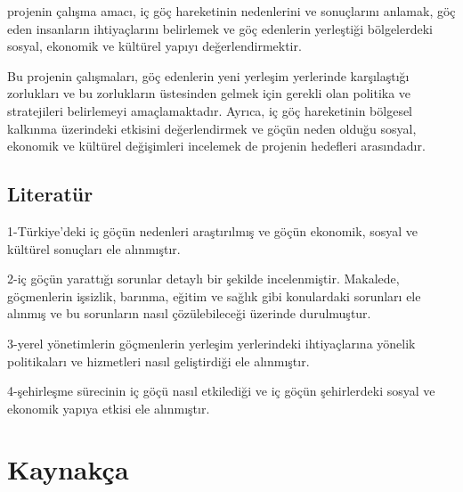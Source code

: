 \documentclass[
  12pt,
]{article}
\newlength{\cslhangindent}
\newlength{\cslentryspacingunit} %
\newenvironment{CSLReferences}[2] %
 {%
  \setlength{\parindent}{0pt}
  \ifodd #1
  \let\oldpar\par
  \def\par{\hangindent=\cslhangindent\oldpar}
  \fi
  \setlength{\parskip}{#2\cslentryspacingunit}
 }%
 {}
\begin{document}
projenin çalışma amacı, iç göç hareketinin nedenlerini ve sonuçlarını anlamak, göç eden insanların ihtiyaçlarını belirlemek ve göç edenlerin yerleştiği bölgelerdeki sosyal, ekonomik ve kültürel yapıyı değerlendirmektir.

Bu projenin çalışmaları, göç edenlerin yeni yerleşim yerlerinde karşılaştığı zorlukları ve bu zorlukların üstesinden gelmek için gerekli olan politika ve stratejileri belirlemeyi amaçlamaktadır. Ayrıca, iç göç hareketinin bölgesel kalkınma üzerindeki etkisini değerlendirmek ve göçün neden olduğu sosyal, ekonomik ve kültürel değişimleri incelemek de projenin hedefleri arasındadır.

\hypertarget{literatuxfcr}{%
\subsection{Literatür}\label{literatuxfcr}}

1-Türkiye'deki iç göçün nedenleri araştırılmış ve göçün ekonomik, sosyal ve kültürel sonuçları ele alınmıştır.

2-iç göçün yarattığı sorunlar detaylı bir şekilde incelenmiştir. Makalede, göçmenlerin işsizlik, barınma, eğitim ve sağlık gibi konulardaki sorunları ele alınmış ve bu sorunların nasıl çözülebileceği üzerinde durulmuştur.

3-yerel yönetimlerin göçmenlerin yerleşim yerlerindeki ihtiyaçlarına yönelik politikaları ve hizmetleri nasıl geliştirdiği ele alınmıştır.

4-şehirleşme sürecinin iç göçü nasıl etkilediği ve iç göçün şehirlerdeki sosyal ve ekonomik yapıya etkisi ele alınmıştır.

\newpage

\hypertarget{references}{%
\section{Kaynakça}\label{references}}

\hypertarget{refs}{}
\begin{CSLReferences}{0}{0}
\end{CSLReferences}
\end{document}
